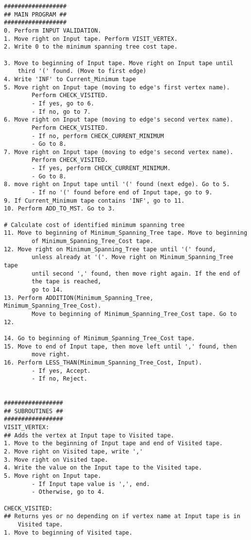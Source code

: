 \documentclass{article}
\begin{document}
\begin{lstlisting}[frame=single]
##################
## MAIN PROGRAM ##
##################
0. Perform INPUT VALIDATION.
1. Move right on Input tape. Perform VISIT_VERTEX.
2. Write 0 to the minimum spanning tree cost tape.

3. Move to beginning of Input tape. Move right on Input tape until 
    third '(' found. (Move to first edge)
4. Write 'INF' to Current_Minimum tape
5. Move right on Input tape (moving to edge's first vertex name). 
        Perform CHECK_VISITED.
        - If yes, go to 6.
        - If no, go to 7.
6. Move right on Input tape (moving to edge's second vertex name). 
        Perform CHECK_VISITED.
        - If no, perform CHECK_CURRENT_MINIMUM
        - Go to 8.
7. Move right on Input tape (moving to edge's second vertex name). 
        Perform CHECK_VISITED.
        - If yes, perform CHECK_CURRENT_MINIMUM.
        - Go to 8.
8. move right on Input tape until '(' found (next edge). Go to 5.
        - If no '(' found before end of Input tape, go to 9.
9. If Current_Minimum tape contains 'INF', go to 11.
10. Perform ADD_TO_MST. Go to 3.

# Calculate cost of identified minimum spanning tree
11. Move to beginning of Minimum_Spanning_Tree tape. Move to beginning
        of Minimum_Spanning_Tree_Cost tape.
12. Move right on Minimum_Spanning_Tree tape until '(' found, 
        unless already at '('. Move right on Minimum_Spanning_Tree tape
        until second ',' found, then move right again. If the end of 
        the tape is reached, 
        go to 14.
13. Perform ADDITION(Minimum_Spanning_Tree, Minimum_Spanning_Tree_Cost). 
        Move to beginning of Minimum_Spanning_Tree_Cost tape. Go to 12.

14. Go to beginning of Minimum_Spanning_Tree_Cost tape.
15. Move to end of Input tape, then move left until ',' found, then 
        move right.
16. Perform LESS_THAN(Minimum_Spanning_Tree_Cost, Input).
        - If yes, Accept.
        - If no, Reject.


#################
## SUBROUTINES ##
#################
VISIT_VERTEX:
## Adds the vertex at Input tape to Visited tape.
1. Move to the beginning of Input tape and end of Visited tape.
2. Move right on Visited tape, write ','
3. Move right on Visited tape.
4. Write the value on the Input tape to the Visited tape.
5. Move right on Input tape.
        - If Input tape value is ',', end.
        - Otherwise, go to 4.

CHECK_VISITED:
## Returns yes or no depending on if vertex name at Input tape is in 
    Visited tape.
1. Move to beginning of Visited tape.


\end{lstlisting}
\end{document}
